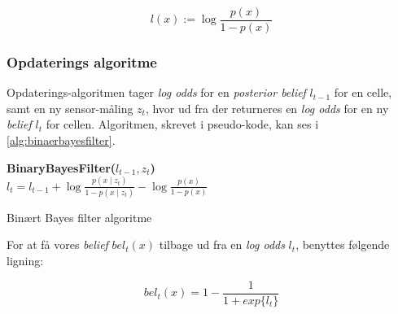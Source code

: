 $$l(x) := \log \frac{p(x)}{1 - p(x)}$$

\subsubsection{Opdaterings algoritme}
Opdaterings-algoritmen tager \textit{log odds} for en \textit{posterior belief} $l_{t-1}$ for en celle, samt en ny sensor-måling $z_t$, hvor ud fra der returneres en \textit{log odds} for en ny \textit{belief} $l_t$ for cellen.
Algoritmen, skrevet i pseudo-kode, kan ses i \cref{alg:binaerbayesfilter}.

\begin{algorithm}[h]
\textbf{BinaryBayesFilter($l_{t-1}, z_t$)} \\
\Indp $l_t = l_{t-1} + \log \frac{p(x \mid z_t)}{1-p(x \mid z_t)} - \log \frac{p(x)}{1-p(x)}$ \\
\caption{Binært Bayes filter algoritme}
\label{alg:binaerbayesfilter}
\end{algorithm}


For at få vores \textit{belief} $bel_t(x)$ tilbage ud fra en \textit{log odds} $l_t$, benyttes følgende ligning:

$$bel_t(x) = 1 - \frac{1}{1 + exp\{l_t\}}$$
